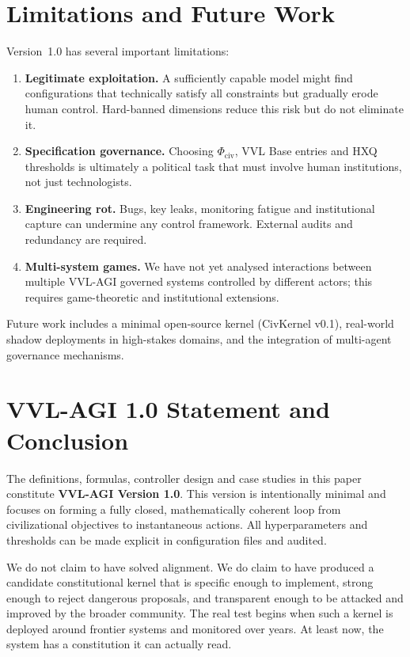 \documentclass[11pt]{article}
\begin{document}
\section{Limitations and Future Work}

Version~1.0 has several important limitations:
\begin{enumerate}[leftmargin=1.8em]
  \item \textbf{Legitimate exploitation.} A sufficiently capable model might find configurations that technically satisfy all constraints but gradually erode human control. Hard-banned dimensions reduce this risk but do not eliminate it.
  \item \textbf{Specification governance.} Choosing $\Phi_{\mathrm{civ}}$, VVL Base entries and HXQ thresholds is ultimately a political task that must involve human institutions, not just technologists.
  \item \textbf{Engineering rot.} Bugs, key leaks, monitoring fatigue and institutional capture can undermine any control framework. External audits and redundancy are required.
  \item \textbf{Multi-system games.} We have not yet analysed interactions between multiple VVL-AGI governed systems controlled by different actors; this requires game-theoretic and institutional extensions.
\end{enumerate}

Future work includes a minimal open-source kernel (CivKernel v0.1), real-world shadow deployments in high-stakes domains, and the integration of multi-agent governance mechanisms.

\section*{VVL-AGI 1.0 Statement and Conclusion}

The definitions, formulas, controller design and case studies in this paper constitute \textbf{VVL-AGI Version 1.0}. This version is intentionally minimal and focuses on forming a fully closed, mathematically coherent loop from civilizational objectives to instantaneous actions. All hyperparameters and thresholds can be made explicit in configuration files and audited.

We do not claim to have solved alignment. We do claim to have produced a candidate constitutional kernel that is specific enough to implement, strong enough to reject dangerous proposals, and transparent enough to be attacked and improved by the broader community. The real test begins when such a kernel is deployed around frontier systems and monitored over years. At least now, the system has a constitution it can actually read.
\end{document}
